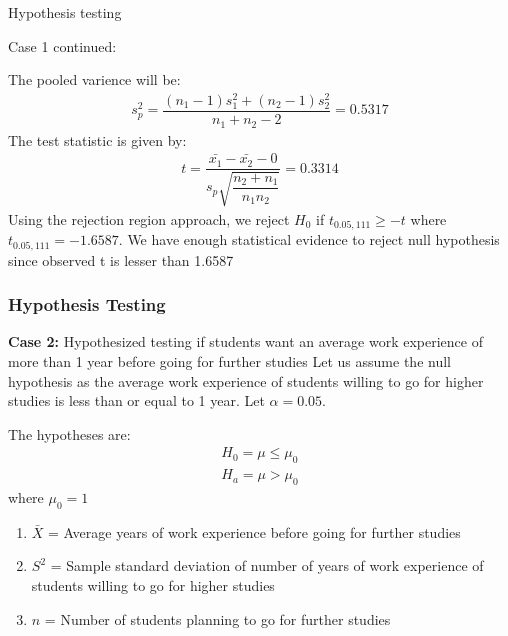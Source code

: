 \documentclass{beamer}
\begin{document}
\begin{frame}{Hypothesis testing}

    \begin{block}{Case 1 continued:}

        The pooled varience will be:
        \begin{align}
            s^2_p=\dfrac{(n_1-1)s^2_1+(n_2-1)s^2_2}{n_1+n_2-2}=0.5317
        \end{align}
        The test statistic is given by:
        \begin{align}
            t=\dfrac{\bar{x_1}-\bar{x_2}-0}{s_p\sqrt{\dfrac{n_2+n_1}{n_1n_2}}}=0.3314
        \end{align}
        Using the rejection region approach, we reject $H_0$ if
        $t_{0.05,111}\geq -t$ where $t_{0.05,111}=-1.6587$. We have enough
        statistical
        evidence to reject null hypothesis since observed t is lesser than
        1.6587

    \end{block}
\end{frame}

\begin{frame}
    \frametitle{Hypothesis Testing}
    \begin{block}{\textbf{Case 2:}{ Hypothesized testing if students want an
                average work experience of more than 1 year before going for
                further studies }}
        Let us assume the null hypothesis as the average work experience of
        students willing to go for higher studies is  less than or equal to 1
        year. Let
        $\alpha =
            0.05$.

        The hypotheses are:
        \begin{align*}
            H_0=\mu\leq \mu_0 \\
            H_a=\mu > \mu_0
        \end{align*}
        where $\mu_0 = 1$

        \begin{enumerate}
            \item	$\bar{X}$ = Average years of work experience before
                  going for
                  further studies\\
            \item	$S^2$ = Sample standard deviation of number of years of
                  work
                  experience of students willing to go for higher studies\\
            \item $n$ = Number of students planning to go for further studies\\
        \end{enumerate}
    \end{block}
\end{frame}
\end{document}
